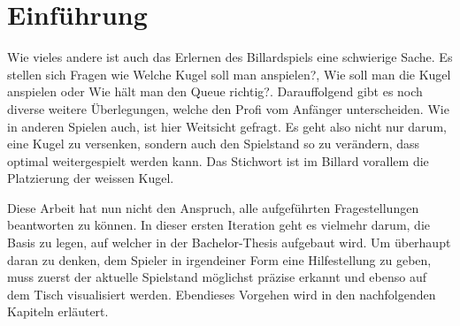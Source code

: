 \chapter{Einführung}
Wie vieles andere ist auch das Erlernen des Billardspiels eine schwierige Sache. Es stellen sich Fragen wie \glqq Welche
Kugel soll man anspielen?\grqq{}, \glqq Wie soll man die Kugel anspielen\grqq{} oder \glqq Wie hält man den Queue richtig?\grqq{}.
Darauffolgend gibt es noch diverse weitere Überlegungen, welche den Profi vom Anfänger unterscheiden. Wie in anderen Spielen
auch, ist hier Weitsicht gefragt. Es geht also nicht nur darum, eine Kugel zu versenken, sondern auch den Spielstand so zu
verändern, dass optimal weitergespielt werden kann. Das Stichwort ist im Billard vorallem die Platzierung der weissen Kugel.

Diese Arbeit hat nun nicht den Anspruch, alle aufgeführten Fragestellungen beantworten zu können. In dieser ersten Iteration
geht es vielmehr darum, die Basis zu legen, auf welcher in der Bachelor-Thesis aufgebaut wird. Um überhaupt daran zu denken,
dem Spieler in irgendeiner Form eine Hilfestellung zu geben, muss zuerst der aktuelle Spielstand möglichst präzise
erkannt und ebenso auf dem Tisch visualisiert werden. Ebendieses Vorgehen wird in den nachfolgenden Kapiteln erläutert.